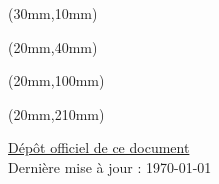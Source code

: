 \begin{textblock*}{500mm}(30mm,10mm)
{ \color{white} 
\TITLE
}
\end{textblock*}

\null\newpage

\begin{textblock*}{\paperwidth}(20mm,40mm)
\raggedright
\TITLE
\end{textblock*}

\begin{textblock*}{\paperwidth}(20mm,100mm)
\raggedright
\AUTHORS
\end{textblock*}


\begin{textblock*}{\paperwidth}(20mm,210mm)
\raggedright
\href{https://github.com/NicholasLangevin/Guide_de_survie_en_actuariat}{Dépôt officiel de ce document} \\
Dernière mise à jour : \today
\end{textblock*}

\null\newpage
